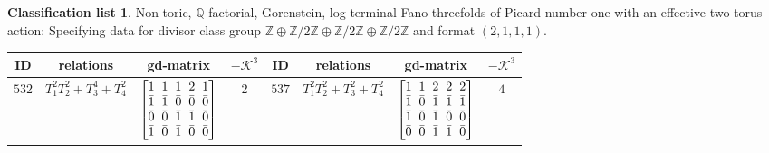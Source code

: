\documentclass[pdftex]{sigma}%
\theoremstyle{definition}
\newtheorem{class-list}[thm]{Classification list}
\def\ZZ{{\mathbb Z}}
\def\QQ{{\mathbb Q}}
\numberwithin{equation}{section}
\begin{document}
\begin{class-list}
Non-toric, $\QQ$-factorial, Gorenstein, log terminal Fano
threefolds of Picard number one with an effective two-torus action:
Specifying data for divisor class group
$\ZZ\oplus \ZZ/2\ZZ\oplus \ZZ/2\ZZ\oplus \ZZ/2\ZZ$ and format $(2,1,1,1)$.
\begin{table}[h!]\centering\setlength{\tabcolsep}{3.5pt}
\renewcommand{\arraystretch}{1.15}\small\tabulinesep=1mm
\begin{tabu}{c|c|c|c||c|c|c|c}
\hline
ID&relations&gd-matrix&$-\mathcal{K}^3$&ID&relations&gd-matrix&$-\mathcal{K}^3$
\\
\hline
${532}$&${T_{1}^{2}T_{2}^{2}+T_{3}^{4}+T_{4}^{2}}$
&$\arraycolsep=1mm\begin{bmatrix}{1} & {1} & {1} & {2} & {1} \\ {\bar{1}} & {\bar{1}} & {\bar{0}} & {\bar{0}} & {\bar{0}} \\ {\bar{0}} & {\bar{0}} & {\bar{1}} & {\bar{1}} & {\bar{0}} \\ {\bar{1}} & {\bar{0}} & {\bar{1}} & {\bar{0}} & {\bar{0}}\end{bmatrix}$
&${2}$
&${537}$&${T_{1}^{2}T_{2}^{2}+T_{3}^{2}+T_{4}^{2}}$
&$\arraycolsep=1mm\begin{bmatrix}{1} & {1} & {2} & {2} & {2} \\ {\bar{1}} & {\bar{0}} & {\bar{1}} & {\bar{1}} & {\bar{1}} \\ {\bar{1}} & {\bar{0}} & {\bar{1}} & {\bar{0}} & {\bar{0}} \\ {\bar{0}} & {\bar{0}} & {\bar{1}} & {\bar{1}} & {\bar{0}}\end{bmatrix}$
&${4}$
\\
\hline
\end{tabu}%
\end{table}
\end{class-list}
\end{document}

